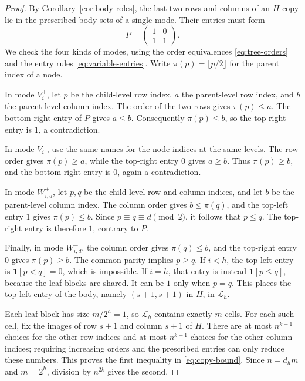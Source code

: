 \begin{proof}
By Corollary~\ref{cor:body-roles}, the last two rows and columns of an
$H$-copy lie in the prescribed body sets of a single mode.  Their entries
must form
\[
 P=\begin{pmatrix}1&0\\1&1\end{pmatrix}.
\]
We check the four kinds of modes, using the order equivalences
\eqref{eq:tree-orders} and the entry rules \eqref{eq:variable-entries}.
Write $\pi(p)=\lfloor p/2\rfloor$ for
the parent index of a node.

In mode $V_i^+$, let $p$ be the child-level row index, $a$ the parent-level
row index, and $b$ the parent-level column index.  The order of the two
rows gives $\pi(p)\leq a$.  The bottom-right entry of $P$ gives $a\leq b$.
Consequently $\pi(p)\leq b$, so the top-right entry is $1$, a
contradiction.

In mode $V_i^-$, use the same names for the node indices at the same
levels.  The row order gives $\pi(p)\geq a$, while the top-right entry
$0$ gives $a\geq b$.  Thus $\pi(p)\geq b$, and the bottom-right entry is
$0$, again a contradiction.

In mode $W_{i,d}^+$, let $p,q$ be the child-level row and column indices,
and let $b$ be the parent-level column index.  The column order gives
$b\leq\pi(q)$, and the top-left entry $1$ gives $\pi(p)\leq b$.
Since $p\equiv q\equiv d\pmod 2$, it follows that $p\leq q$.  The
top-right entry is therefore $1$, contrary to $P$.

Finally, in mode $W_{i,d}^-$, the column order gives $\pi(q)\leq b$,
and the top-right entry $0$ gives $\pi(p)\geq b$.  The common parity
implies $p\geq q$.  If $i<h$, the top-left entry is
$\mathbf 1[p<q]=0$, which is impossible.  If $i=h$, that entry is instead
$\mathbf 1[p\leq q]$, because the leaf blocks are shared.  It can be $1$
only when $p=q$.  This places the top-left entry of the body, namely
$(s+1,s+1)$ in $H$, in $\mathcal L_h$.

Each leaf block has size $m/2^h=1$, so $\mathcal L_h$ contains exactly
$m$ cells.  For each such cell, fix the images of row $s+1$ and column
$s+1$ of $H$.  There are at most $n^{k-1}$ choices for the other row
indices and at most $n^{k-1}$ choices for the other column indices;
requiring increasing orders and the prescribed entries can only reduce
these numbers.  This proves the first inequality in
\eqref{eq:copy-bound}.  Since $n=d_hm$ and $m=2^h$, division by $n^{2k}$
gives the second.
\end{proof}


